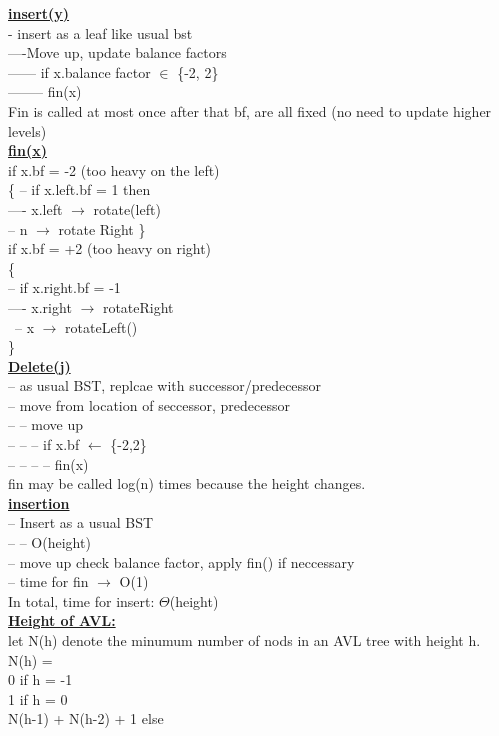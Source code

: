 \documentclass[12pt]{article}
\newcommand{\myt}[1]{\textbf{\underline{#1}}}
\begin{document}
	\myt{insert(y)}\\
	- insert as a leaf like usual bst\\
	----Move up, update balance factors\\
	------ if  x.balance factor $\in$ \{-2, 2\}\\
	-------- fin(x)\\
	Fin is called at most once after that bf, are all fixed (no need to update higher levels)\\
	
	\myt{fin(x)}\\
	if x.bf = -2 (too heavy on the left)\\
	\{
	-- if x.left.bf = 1 then\\
	---- x.left $\rightarrow$ rotate(left)\\
	-- n $\rightarrow$ rotate Right
	\}\\
	
	if x.bf = +2 (too heavy on right)\\
	\{\\
	-- if x.right.bf = -1\\
	---- x.right $\rightarrow$ rotateRight\\\
	-- x $\rightarrow$ rotateLeft()\\
	\}\\
	
	\myt{Delete(j)}\\
	-- as usual BST, replcae with successor/predecessor\\
	-- move from location of seccessor, predecessor\\
	-- -- move up\\
	-- -- -- if x.bf $\leftarrow$ \{-2,2\}\\
	-- -- -- -- fin(x)\\
	
	fin may be called log(n) times because the height changes.\\
	
	\myt{insertion}\\
	-- Insert as a usual BST\\
	-- -- O(height)\\
	-- move up check balance factor, apply fin() if neccessary\\
	-- time for fin $\rightarrow$ O(1)\\
	In total, time for insert: $\Theta$(height)\\
	
	\myt{Height of AVL:}\\
	let N(h) denote the minumum number of nods in an AVL tree with height h.\\
	N(h) = \\
	0 if h = -1\\
	1 if h = 0\\
	N(h-1) + N(h-2) + 1 else\\
	
\end{document}
